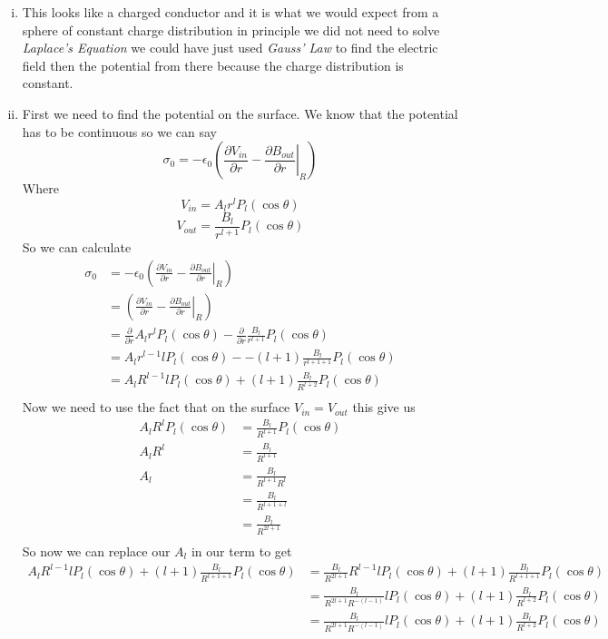 \documentclass[11pt]{article}
\numberwithin{equation}{section}
\begin{document}
\begin{enumerate}[(i)]
\item
This looks like a charged conductor and it is what we would expect from a sphere of constant charge distribution in principle we did not need to solve \emph{Laplace's Equation} we could have just used \emph{Gauss' Law} to find the electric field then the potential from there because the charge distribution is constant.
\item
First we need to find the potential on the surface. We know that the potential has to be continuous so we can say
$$\sigma_0 = -\epsilon_0 \left(\left.\frac{\partial V_{in}}{\partial r} - \frac{\partial B_{out}}{\partial r}\right|_R\right)$$
Where
$$V_{in} = A_lr^lP_l(\cos\theta)$$
$$V_{out} = \frac{B_l}{r^{l+1}}P_l(\cos\theta)$$
So we can calculate 
\begin{align*}
\sigma_0 &= -\epsilon_0 \left(\left.\frac{\partial V_{in}}{\partial r} - \frac{\partial B_{out}}{\partial r}\right|_R\right)\\
&= \left(\left.\frac{\partial V_{in}}{\partial r} - \frac{\partial B_{out}}{\partial r}\right|_R\right)\\
&= \frac{\partial}{\partial r}A_lr^lP_l(\cos\theta) - \frac{\partial}{\partial r}\frac{B_l}{r^{l+1}}P_l(\cos\theta)\\
&= A_lr^{l-1}lP_l(\cos\theta) - -(l+1)\frac{B_l}{r^{l+1+1}}P_l(\cos\theta)\\
&= A_lR^{l-1}lP_l(\cos\theta) +(l+1)\frac{B_l}{R^{l+2}}P_l(\cos\theta)\\
\end{align*}
Now we need to use the fact that on the surface $V_{in} = V_{out}$ this give us
\begin{align*}
A_lR^lP_l(\cos\theta) &= \frac{B_l}{R^{l+1}}P_l(\cos\theta)\\
A_lR^l&= \frac{B_l}{R^{l+1}}\\
A_l&= \frac{B_l}{R^{l+1}R^l}\\
&= \frac{B_l}{R^{l+1+l}}\\
&= \frac{B_l}{R^{2l+1}}\\
\end{align*}
So now we can replace our $A_l$ in our term to get
\begin{align*}
A_lR^{l-1}lP_l(\cos\theta) +(l+1)\frac{B_l}{R^{l+1+1}}P_l(\cos\theta) &= \frac{B_l}{R^{2l+1}}R^{l-1}lP_l(\cos\theta) +(l+1)\frac{B_l}{R^{l+1+1}}P_l(\cos\theta) \\
&= \frac{B_l}{R^{2l+1}R^{-(l-1)}}lP_l(\cos\theta) +(l+1)\frac{B_l}{R^{l+2}}P_l(\cos\theta) \\
&= \frac{B_l}{R^{2l+1}R^{-(l-1)}}lP_l(\cos\theta) +(l+1)\frac{B_l}{R^{l+2}}P_l(\cos\theta) \\

\end{align*}
\end{enumerate}
\end{document}
